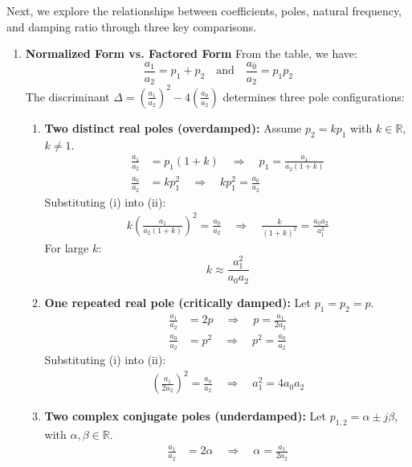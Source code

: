 Next, we explore the relationships between coefficients, poles,
natural frequency, and damping ratio through three key comparisons.
\begin{enumerate}
  \item \textbf{Normalized Form vs. Factored Form}
    \noindent From the table, we have:
    \[ \frac{a_1}{a_2} = p_1 + p_2 \quad \text{and} \quad \frac{a_0}{a_2} = p_1 p_2 \]
    The discriminant
    \(\displaystyle \Delta = \left( \frac{a_1}{a_2} \right)^2 - 4 \left( \frac{a_0}{a_2} \right) \)
    determines three pole configurations:
    \begin{enumerate}
      \item \textbf{Two distinct real poles (overdamped):} Assume \( p_2 = k p_1 \) with \( k \in \mathbb{R} \), \( k \neq 1 \).
        \begin{align*}
          \frac{a_1}{a_2} &= p_1(1 + k) \quad \Rightarrow \quad p_1 = \frac{a_1}{a_2(1 + k)} \tag{i} \\
          \frac{a_0}{a_2} &= k p_1^2 \quad \Rightarrow \quad k p_1^2 = \frac{a_0}{a_2} \tag{ii}
        \end{align*}
        Substituting (i) into (ii):
        \begin{align*}
        k \left( \frac{a_1}{a_2(1 + k)} \right)^2 = \frac{a_0}{a_2}
        \quad \Rightarrow \quad
        \frac{k}{(1+k)^2} = \frac{a_0 a_2}{a_1^2}
        \end{align*}
        For large \(k\):
        \[ \boxed{k \approx \frac{a_1^2}{a_0 a_2}} \]
      \item \textbf{One repeated real pole (critically damped):} Let \( p_1 = p_2 = p \).
        \begin{align*}
          \frac{a_1}{a_2} &= 2p \quad \Rightarrow \quad p = \frac{a_1}{2a_2} \tag{i} \\
          \frac{a_0}{a_2} &= p^2 \quad \Rightarrow \quad p^2 = \frac{a_0}{a_2} \tag{ii}
        \end{align*}
        Substituting (i) into (ii):
        \begin{align*}
          \left( \frac{a_1}{2a_2} \right)^2 = \frac{a_0}{a_2}
          \quad \Rightarrow \quad
          \boxed{a_1^2 = 4 a_0 a_2}
        \end{align*}
      \item \textbf{Two complex conjugate poles (underdamped):} Let \( p_{1,2} = \alpha \pm j\beta \), with \( \alpha, \beta \in \mathbb{R} \).
        \begin{align*}
          \frac{a_1}{a_2} &= 2\alpha \quad \Rightarrow \quad \alpha = \frac{a_1}{2a_2} \tag{i} \\

\end{align*}
\end{enumerate}
\end{enumerate}
